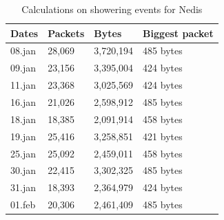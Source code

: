 \begin{table}[H]
\centering
    \caption{Calculations on showering events for Nedis}
\label{tab:NedisShoweringCalculations}
    \begin{tabular}{|l|l|l|l|}
        \hline
        \textbf{Dates} & \textbf{Packets} & \textbf{Bytes} & \textbf{Biggest packet} \\ \hline
        08.jan          & 28,069           & 3,720,194      & 485 bytes               \\ \hline
        09.jan          & 23,156           & 3,395,004      & 424 bytes               \\ \hline
        11.jan          & 23,368           & 3,025,569      & 424 bytes               \\ \hline
        16.jan          & 21,026           & 2,598,912      & 485 bytes               \\ \hline
        18.jan          & 18,385           & 2,091,914      & 458 bytes               \\ \hline
        19.jan          & 25,416           & 3,258,851      & 421 bytes               \\ \hline
        25.jan          & 25,092           & 2,459,011      & 458 bytes               \\ \hline
        30.jan          & 22,415           & 3,302,325      & 485 bytes               \\ \hline
        31.jan          & 18,393           & 2,364,979      & 424 bytes               \\ \hline
        01.feb          & 20,306           & 2,461,409      & 485 bytes               \\ \hline
    \end{tabular}
\end{table}


